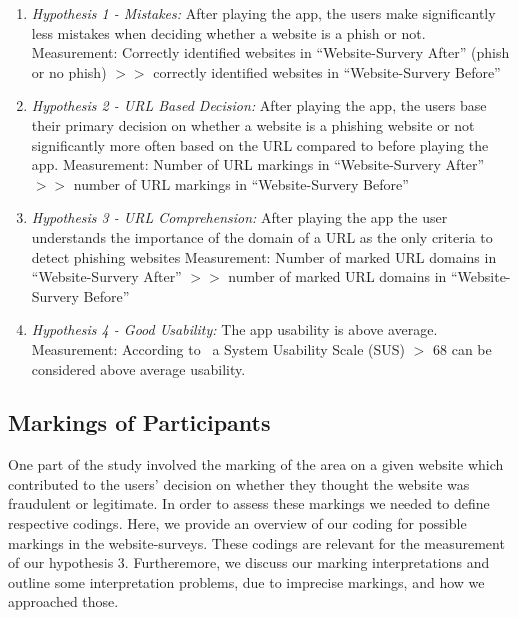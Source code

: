 \begin{enumerate}
	\item \textit{Hypothesis 1 - Mistakes:} After playing the app, the users make significantly less mistakes when deciding whether a website is a phish or not.\newline
	Measurement: Correctly identified websites in ``Website-Survery After'' (phish or no phish) $>>$ correctly identified websites in ``Website-Survery Before''
	\item \textit{Hypothesis 2 - URL Based Decision:} After playing the app, the users base their primary decision on whether a website is a phishing website or not significantly more often based on the URL compared to before playing the app.\newline
	Measurement: Number of URL markings in ``Website-Survery After'' $>>$ number of URL markings in ``Website-Survery Before''
	\item \textit{Hypothesis 3 - URL Comprehension:} After playing the app the user understands the importance of the domain of a URL as the only criteria to detect phishing websites\newline
Measurement: Number of marked URL domains in ``Website-Survery After''  $>>$ number of marked URL domains in ``Website-Survery Before'' 
	\item \textit{Hypothesis 4 - Good Usability:} The app usability is above average. \newline
Measurement: According to~\cite{sus}  a System Usability Scale (SUS) $>$ 68 can be considered above average usability.
\end{enumerate}

\subsection{Markings of Participants}
\label{s:markings}
One part of the study involved the marking of the area on a given website which contributed to the users' decision on whether they thought the website was fraudulent or legitimate.
In order to assess these markings we needed to define respective codings.
Here, we provide an overview of our coding for possible markings in the website-surveys.
These codings are relevant for the measurement of our hypothesis 3.
Furtheremore, we discuss our marking interpretations and outline some interpretation problems, due to imprecise markings, and how we approached those.

